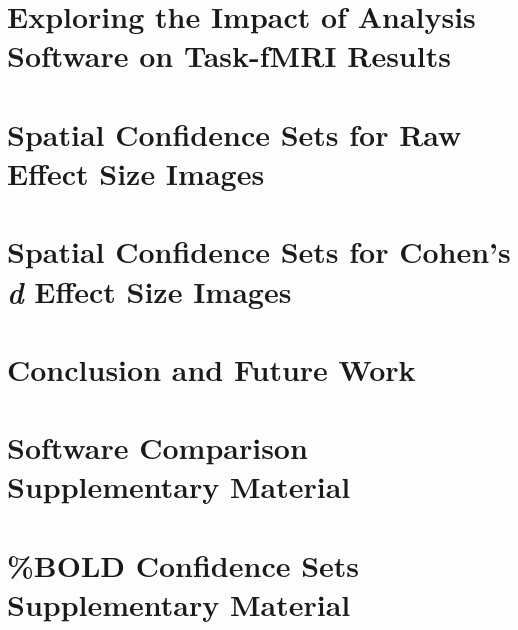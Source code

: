 \documentclass[11pt,a4paper]{report}
\begin{document}
\chapter{Exploring the Impact of Analysis Software on Task-fMRI Results}
\label{chap:software}


\chapter{Spatial Confidence Sets for Raw Effect Size Images}
\label{chap:BOLD}


\chapter{Spatial Confidence Sets for Cohen's \textit{d} Effect Size Images}
\label{chap:cohen}

 
\chapter{Conclusion and Future Work}
\label{chap:conclusion}

%
%

\appendix                            %
\chapter{Software Comparison Supplementary Material}

\chapter{\%BOLD Confidence Sets Supplementary Material}

\end{document}
